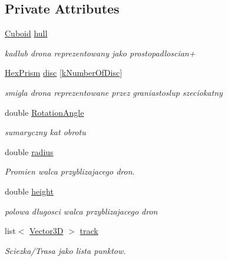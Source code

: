 \subsection*{Private Attributes}
\begin{DoxyCompactItemize}
\item 
\hyperlink{class_cuboid}{Cuboid} \hyperlink{class_quadracopter_a1bc37defc8b79a02c1abba10e69742a7}{hull}
\begin{DoxyCompactList}\small\item\em kadlub drona reprezentowany jako prostopadloscian+ \end{DoxyCompactList}\item 
\hyperlink{class_hex_prism}{Hex\+Prism} \hyperlink{class_quadracopter_a51b2350b8ec3efc0906228595ffcecd1}{disc} \mbox{[}\hyperlink{_quadracopter_8hh_ae118ca9ee93d6a5f2588b28d39dee76b}{k\+Number\+Of\+Disc}\mbox{]}
\begin{DoxyCompactList}\small\item\em smigla drona reprezentowane przez graniastoslup szeciokatny \end{DoxyCompactList}\item 
double \hyperlink{class_quadracopter_a2d2329d63abb5ff624dc1d95660a08b4}{Rotation\+Angle}
\begin{DoxyCompactList}\small\item\em sumaryczny kat obrotu \end{DoxyCompactList}\item 
double \hyperlink{class_quadracopter_a34736716e6c9c1ef8a73dec7e4dc2485}{radius}
\begin{DoxyCompactList}\small\item\em Promien walca przyblizajacego dron. \end{DoxyCompactList}\item 
double \hyperlink{class_quadracopter_aebaeeec3692eeff5e6d51549e9eb0619}{height}
\begin{DoxyCompactList}\small\item\em polowa dlugosci walca przyblizajacego dron \end{DoxyCompactList}\item 
list$<$ \hyperlink{vector3_d_8hh_a8790ef07836c1639da216f46501979c0}{Vector3D} $>$ \hyperlink{class_quadracopter_a04bd01dc2756f344af906ffb4f8b6655}{track}
\begin{DoxyCompactList}\small\item\em Sciezka/\+Trasa jako lista punktow. \end{DoxyCompactList}\end{DoxyCompactItemize}
